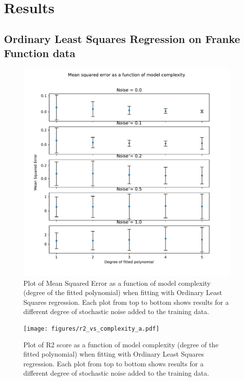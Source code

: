\section{Results}
\subsection{Ordinary Least Squares Regression on Franke Function data}
\begin{figure}[h]
    \includegraphics[width = 0.8\paperwidth]{figures/mse_vs_complexity_a.pdf}
    \caption{Plot of Mean Squared Error as a function of model complexity (degree of the
	    fitted polynomial) when fitting with Ordinary Least Squares regression. Each plot
	    from top to bottom shows results for a different degree of stochastic noise added
	    to the training data.}
    \label{fig:ols-mse-complexity}
\end{figure}

\begin{figure}[h]
    \texttt{[image: figures/r2\_vs\_complexity\_a.pdf]}
    \caption{Plot of R2 score as a function of model complexity (degree of the
	    fitted polynomial) when fitting with Ordinary Least Squares regression. Each plot
	    from top to bottom shows results for a different degree of stochastic noise added
	    to the training data.}
    \label{fig:ols-r2-complexity}
\end{figure}

